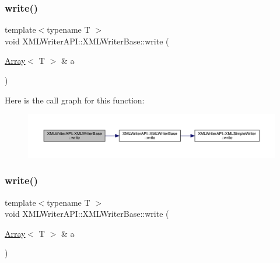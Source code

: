 \subsubsection{\texorpdfstring{write()}{write()}\hspace{0.1cm}{\footnotesize\ttfamily [38/39]}}
{\footnotesize\ttfamily template$<$typename T $>$ \\
void X\+M\+L\+Writer\+A\+P\+I\+::\+X\+M\+L\+Writer\+Base\+::write (\begin{DoxyParamCaption}\item[{\mbox{\hyperlink{classXMLArray_1_1Array}{Array}}$<$ T $>$ \&}]{a }\end{DoxyParamCaption})\hspace{0.3cm}{\ttfamily [inline]}}

Here is the call graph for this function\+:
\nopagebreak
\begin{figure}[H]
\begin{center}
\leavevmode
\includegraphics[width=350pt]{d5/df5/classXMLWriterAPI_1_1XMLWriterBase_a5475e21d716c65a21d620b4cde0c9ca1_cgraph}
\end{center}
\end{figure}
\mbox{\label{classXMLWriterAPI_1_1XMLWriterBase_a5475e21d716c65a21d620b4cde0c9ca1}} 
\subsubsection{\texorpdfstring{write()}{write()}\hspace{0.1cm}{\footnotesize\ttfamily [39/39]}}
{\footnotesize\ttfamily template$<$typename T $>$ \\
void X\+M\+L\+Writer\+A\+P\+I\+::\+X\+M\+L\+Writer\+Base\+::write (\begin{DoxyParamCaption}\item[{\mbox{\hyperlink{classXMLArray_1_1Array}{Array}}$<$ T $>$ \&}]{a }\end{DoxyParamCaption})\hspace{0.3cm}{\ttfamily [inline]}}

